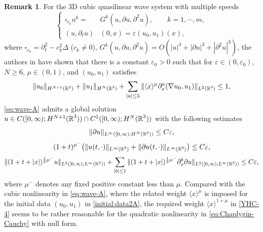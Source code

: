 \documentclass[11pt,twoside]{article}
\def\R{\mathop{\mathbb R\kern 0pt}\nolimits}
\def\f{\frac}
\def\p{\partial}
\def\ve{\varepsilon}
\theoremstyle{plain}
\theoremstyle{definition}
\theoremstyle{assumption}
\newtheorem{remark}{Remark}[section]
\numberwithin{equation}{section}
\begin{document}
	
	
\begin{remark}\label{Rem-4}	
For the 3D cubic quasilinear wave system with multiple speeds
\begin{equation}\label{eq:wave-A}
\left\{
\begin{aligned}
\square_{c_k} u^k=&G^k(u,\p u,\p^2 u),\qquad k=1,\cdots,m, \\
(u,\p_tu)&(0,x)=\ve(u_{0},u_{1})(x),
\end{aligned}
\right.
\end{equation}
where $\square_{c_k}=\p_t^2-c_k^2\Delta$ ($c_k\not=0$), $G^k(u,\p u,\p^2 u)=O(|u|^3+|\p u|^3+|\p^2 u|^3)$,
the authors in \cite{GaoLiYin2026} have shown that there is a constant $\ve_0>0$ such that for $\ve\in(0,\ve_0)$,
$N\ge 6$, $\mu\in (0,1)$, and $(u_{0},u_{1})$ satisfies
\begin{equation}\label{initial:data2A}
\|u_{0}\|_{H^{N+1}(\R^3)}+\|u_1\|_{H^N(\R^3)}+\sum_{|a|\le 5}\|\langle x\rangle^{\mu}\p^a_x(\nabla u _0,u_1)\|_{L^2(\R^3)}\le 1,
\end{equation}
\eqref{eq:wave-A} admits a global solution $u\in C([0, \infty);H^{N+1}(\R^3))\cap C^1([0, \infty);H^N(\R^3))$
with the following estimates
\begin{equation}\label{YHCCC-1A}
\|\p u\|_{L^\infty([0,\infty);H^N(\R^3))}\le C\varepsilon,
\end{equation}
\begin{equation}\label{YHCCC-2A}
(1+t)^{\mu^-}\big(\|u(t,\cdot)\|_{L^\infty(\R^3)}+\|\p u(t,\cdot)\|_{L^\infty(\R^3)}\big)\le C\varepsilon,
\end{equation}
\begin{equation}\label{YHCCC-3A}
\|(1+t+|x|)^{\f{1}{2}\mu^-}u\|_{L^{2}([0,\infty); L^\infty(\R^3))}
+\sum_{|b|\le 1}\|(1+t+|x|)^{\f{1}{2}\mu^-}\p_x^b\p u\|_{L^{2}([0,\infty); L^\infty(\R^3))}\le C\varepsilon,
\end{equation}
where $\mu^-$ denotes any fixed positive constant less than $\mu$. Compared with the cubic nonlinearity in \eqref{eq:wave-A},
where the related weight  $\langle x\rangle^{\mu}$ is imposed for the initial data $(u_{0},u_{1})$ in \eqref{initial:data2A},
the required weight $\langle x\rangle^{1+\mu}$ in \eqref{YHC-4}
seems to be rather reasonable for the quadratic nonlinearity in \eqref{eq:Chaplygin-Cauchy} with null form.
\end{remark}		
\end{document}
